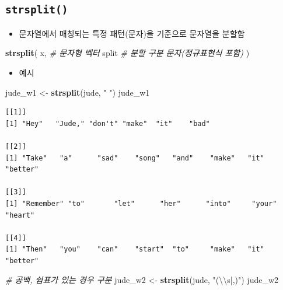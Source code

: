 \documentclass[
  11pt,
]{krantz}
\newenvironment{Shaded}{\begin{snugshade}}{\end{snugshade}}
\newcommand{\CharTok}[1]{\textcolor[rgb]{0.5,0.5,0.5}{#1}}
\newcommand{\CommentTok}[1]{\textcolor[rgb]{0.37,0.37,0.37}{\textit{#1}}}
\newcommand{\KeywordTok}[1]{\textcolor[rgb]{0.27,0.27,0.27}{\textbf{#1}}}
\newcommand{\NormalTok}[1]{#1}
\newcommand{\StringTok}[1]{\textcolor[rgb]{0.5,0.5,0.5}{#1}}
\providecommand{\tightlist}{%
  \setlength{\itemsep}{0pt}\setlength{\parskip}{0pt}}
\begin{document}
\hypertarget{strsplit}{%
\subsection{\texorpdfstring{\textbf{\texttt{strsplit()}}}{strsplit()}}\label{strsplit}}

\begin{itemize}
\tightlist
\item
  문자열에서 매칭되는 특정 패턴(문자)을 기준으로 문자열을 분할함
\end{itemize}

\footnotesize

\begin{Shaded}
\begin{Highlighting}[]
\KeywordTok{strsplit}\NormalTok{(}
\NormalTok{  x,    }\CommentTok{# 문자형 벡터}
\NormalTok{  split }\CommentTok{# 분할 구분 문자(정규표현식 포함)}
\NormalTok{)}
\end{Highlighting}
\end{Shaded}

\normalsize

\begin{itemize}
\tightlist
\item
  예시
\end{itemize}

\footnotesize

\begin{Shaded}
\begin{Highlighting}[]
\NormalTok{jude_w1 <-}\StringTok{ }\KeywordTok{strsplit}\NormalTok{(jude, }\StringTok{" "}\NormalTok{)}
\NormalTok{jude_w1}
\end{Highlighting}
\end{Shaded}

\begin{verbatim}
[[1]]
[1] "Hey"   "Jude," "don't" "make"  "it"    "bad"  

[[2]]
[1] "Take"   "a"      "sad"    "song"   "and"    "make"   "it"     "better"

[[3]]
[1] "Remember" "to"       "let"      "her"      "into"     "your"     "heart"   

[[4]]
[1] "Then"   "you"    "can"    "start"  "to"     "make"   "it"     "better"
\end{verbatim}

\begin{Shaded}
\begin{Highlighting}[]
\CommentTok{# 공백, 쉼표가 있는 경우 구분}
\NormalTok{jude_w2 <-}\StringTok{ }\KeywordTok{strsplit}\NormalTok{(jude, }\StringTok{"(}\CharTok{\textbackslash{}\textbackslash{}}\StringTok{s|,)"}\NormalTok{)}
\NormalTok{jude_w2}
\end{Highlighting}
\end{Shaded}
\end{document}
